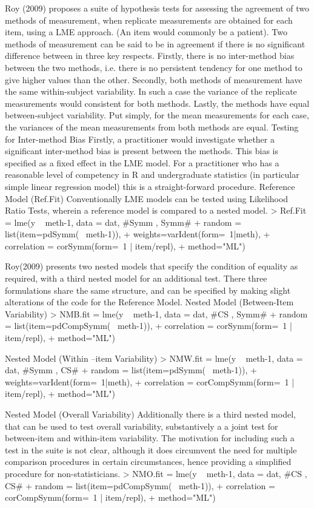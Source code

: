 Roy (2009) proposes a suite of hypothesis tests for assessing the agreement of two methods of measurement, when replicate measurements are obtained for each item, using a LME approach. (An item would commonly be a patient).  
Two methods of measurement can be said to be in agreement if there is no significant difference between in three key respects. Firstly, there is no inter-method bias between the two methods, i.e. there is no persistent tendency for one method to give higher values than the other.
Secondly, both methods of measurement have the same  within-subject variability. In such a case the variance of the replicate measurements would consistent for both methods.
Lastly, the methods have equal between-subject variability.  Put simply, for the mean measurements for each case, the variances of the mean measurements from both methods are equal.
Testing for Inter-method Bias
Firstly, a practitioner would investigate whether a significant inter-method bias is present between the methods. This bias is specified as a fixed effect in the LME model.  For a practitioner who has a reasonable level of competency in R and undergraduate statistics (in particular simple linear regression model) this is a straight-forward procedure.
Reference Model (Ref.Fit)
Conventionally LME models can be tested using Likelihood Ratio Tests, wherein a reference model is compared to a nested model.
> Ref.Fit = lme(y ~ meth-1, data = dat,   #Symm , Symm#
+     random = list(item=pdSymm(~ meth-1)), 
+     weights=varIdent(form=~1|meth),
+     correlation = corSymm(form=~1 | item/repl), 
+     method="ML")

Roy(2009) presents two nested models that specify the condition of equality as required, with a third nested model for an additional test. There three formulations share the same structure, and can be specified by making slight alterations of the code for the Reference Model.
Nested Model (Between-Item Variability)
> NMB.fit  = lme(y ~ meth-1, data = dat,   #CS , Symm#
+     random = list(item=pdCompSymm(~ meth-1)),
+     correlation = corSymm(form=~1 | item/repl), 
+     method="ML")





Nested Model (Within –item Variability)
> NMW.fit = lme(y ~ meth-1, data = dat,   #Symm , CS# 
+     random = list(item=pdSymm(~ meth-1)),
+     weights=varIdent(form=~1|meth), 
+     correlation = corCompSymm(form=~1 | item/repl), 
+     method="ML")


Nested Model (Overall Variability)
Additionally there is a third nested model, that can be used to test overall variability, substantively a a joint test for between-item and within-item variability. The motivation for including such a test in the suite is not clear, although it does circumvent the need for multiple comparison procedures in certain circumstances, hence providing a simplified procedure for non-statisticians.
> NMO.fit = lme(y ~ meth-1, data = dat,   #CS , CS# 
+     random = list(item=pdCompSymm(~ meth-1)), 
+     correlation = corCompSymm(form=~1 | item/repl), 
+     method="ML")


